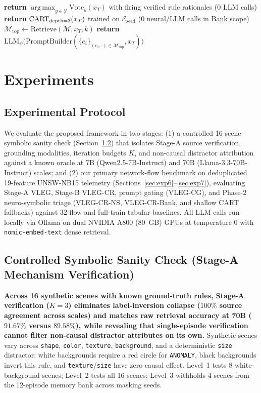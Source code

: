 \documentclass[11pt,letterpaper,onecolumn]{article}
\begin{document}
\begin{algorithm}[htbp]
\begin{algorithmic}[1]
    \State \textbf{return} $\operatorname{arg\,max}_{y \in \mathcal{Y}} \mathrm{Vote}_y(x_T)$ with firing verified rule rationales (0 LLM calls)
    \State \textbf{return} $\textnormal{CART}_{\textnormal{depth}=3}(x_T)$ trained on $\mathcal{E}_{\mathrm{seed}}$ (0 neural/LLM calls in Bank scope)
\Else
     \State $\mathcal{M}_{\mathrm{top}} \gets \mathrm{Retrieve}(\mathcal{M}, x_T, k)$ \EndIf
    \State \textbf{return} $\mathrm{LLM}_\psi\big(\mathrm{PromptBuilder}(\{e_i\}_{(e_i,\cdot)\in\mathcal{M}_{\mathrm{top}}}, x_T)\big)$
\EndIf
\end{algorithmic}
\end{algorithm}

\section{Experiments}
\subsection{Experimental Protocol}
We evaluate the proposed framework in two stages: (1) a controlled 16-scene symbolic sanity check (Section~\ref{sec:symbolic}) that isolates Stage-A source verification, grounding modalities, iteration budgets $K$, and non-causal distractor attribution against a known oracle at 7B (Qwen2.5-7B-Instruct) and 70B (Llama-3.3-70B-Instruct) scales; and (2) our primary network-flow benchmark on deduplicated 19-feature UNSW-NB15 telemetry (Sections~\ref{sec:exp6}--\ref{sec:exp7}), evaluating Stage-A VLEG, Stage-B VLEG-CR, prompt gating (VLEG-CG), and Phase-2 neuro-symbolic triage (VLEG-CR-NS, VLEG-CR-Bank, and shallow CART fallbacks) against 32-flow and full-train tabular baselines. All LLM calls run locally via Ollama on dual NVIDIA A800 (80~GB) GPUs at temperature $0$ with \texttt{nomic-embed-text} dense retrieval.

\subsection{Controlled Symbolic Sanity Check (Stage-A Mechanism Verification)}
\label{sec:symbolic}
\textbf{Across 16 synthetic scenes with known ground-truth rules, Stage-A verification ($K=3$) eliminates label-inversion collapse ($100\%$ source agreement across scales) and matches raw retrieval accuracy at 70B ($91.67\%$ versus $89.58\%$), while revealing that single-episode verification cannot filter non-causal distractor attributes on its own.} Synthetic scenes vary across \texttt{shape}, \texttt{color}, \texttt{texture}, \texttt{background}, and a deterministic \texttt{size} distractor: white backgrounds require a red circle for \texttt{ANOMALY}, black backgrounds invert this rule, and \texttt{texture}/\texttt{size} have zero causal effect. Level~1 tests 8 white-background scenes; Level~2 tests all 16 scenes; Level~3 withholds 4 scenes from the 12-episode memory bank across masking seeds.
\end{document}
